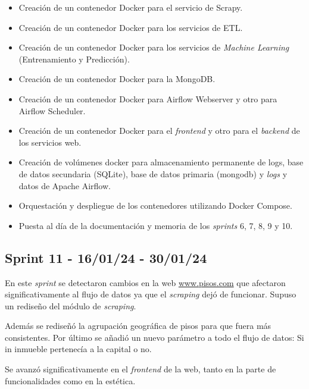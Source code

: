 \begin{itemize}
    \item Creación de un contenedor Docker para el servicio de Scrapy.
    \item Creación de un contenedor Docker para los servicios de ETL.
    \item Creación de un contenedor Docker para los servicios de \textit{Machine Learning} (Entrenamiento y Predicción).
    \item Creación de un contenedor Docker para la MongoDB.
    \item Creación de un contenedor Docker para Airflow Webserver y otro para Airflow Scheduler.
    \item Creación de un contenedor Docker para el \textit{frontend} y otro para el \textit{backend} de los servicios web.
    \item Creación de volúmenes docker para almacenamiento permanente de logs, base de datos secundaria (SQLite), base de datos primaria (mongodb) y \textit{logs} y datos de Apache Airflow.
    \item Orquestación y despliegue de los contenedores utilizando Docker Compose.
    \item Puesta al día de la documentación y memoria de los \textit{sprints} 6, 7, 8, 9 y 10.
\end{itemize}

\subsection{Sprint 11 -  16/01/24 - 30/01/24}

En este \textit{sprint} se detectaron cambios en la web \url{www.pisos.com} que afectaron significativamente al flujo de datos ya que el \textit{scraping} dejó de funcionar. Supuso un rediseño del módulo de \textit{scraping}.

Además se rediseñó la agrupación geográfica de pisos para que fuera más consistentes. Por último se añadió un nuevo parámetro a todo el flujo de datos: Si in inmueble pertenecía a la capital o no.

Se avanzó significativamente en el \textit{frontend} de la web, tanto en la parte de funcionalidades como en la estética.



